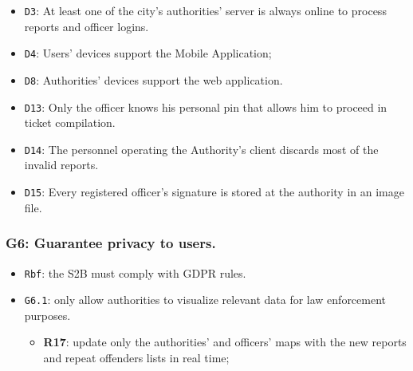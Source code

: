 \documentclass[12pt,a4paper]{article}
\begin{document}
	\begin{itemize}
			\item \texttt{D3}: At least one of the city's authorities' server is always online to process reports and officer logins.
			\item \texttt{D4}: Users' devices support the Mobile Application;
			\item \texttt{D8}: Authorities' devices support the web application.
			\item \texttt{D13}: Only the officer knows his personal pin that allows him to proceed in ticket compilation.
			\item \texttt{D14}: The personnel operating the Authority's client discards most of the invalid reports.
			\item \texttt{D15}: Every registered officer's signature is stored at the authority in an image file.
	\end{itemize}

\subsubsection{G6: Guarantee privacy to users.}
	
	\begin{itemize}
	\item \texttt{Rbf}: the S2B must comply with GDPR rules.
	\item \texttt{G6.1}: only allow authorities to visualize relevant data for law enforcement purposes.
							\begin{itemize}
									\item \textbf{R17}: update only the authorities' and officers' maps with the new reports and repeat offenders lists in real time;
							\end{itemize}
	\end{itemize}

\newpage
\end{document}
